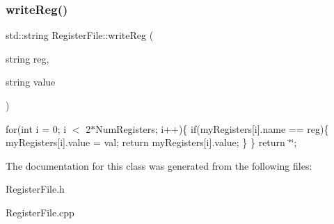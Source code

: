 \subsubsection{\texorpdfstring{write\+Reg()}{writeReg()}}
{\footnotesize\ttfamily std\+::string Register\+File\+::write\+Reg (\begin{DoxyParamCaption}\item[{string}]{reg,  }\item[{string}]{value }\end{DoxyParamCaption})}

for(int i = 0; i $<$ 2$\ast$\+Num\+Registers; i++)\{ if(my\+Registers\mbox{[}i\mbox{]}.name == reg)\{ my\+Registers\mbox{[}i\mbox{]}.value = val; return my\+Registers\mbox{[}i\mbox{]}.value; \} \} return \char`\"{}\char`\"{}; 

The documentation for this class was generated from the following files\+:\begin{DoxyCompactItemize}
\item 
Register\+File.\+h\item 
Register\+File.\+cpp\end{DoxyCompactItemize}

